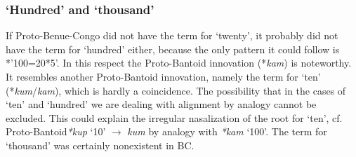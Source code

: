 \clearpage
\subsubsection{‘Hundred’ and ‘thousand’}\label{sec:3.1.4.10}
\begin{table}
\caption{\label{tab:3:63}BC stems and patterns for `100'  and `1000'}


\end{table}

If Proto-Benue-Congo did not have the term for ‘twenty’, it probably did not have the term for ‘hundred’ either, because the only pattern it could follow is *’100=20*5’. In this respect the Proto-Bantoid innovation (*\textit{kam}) is noteworthy. It resembles another Proto-Bantoid innovation, namely the term for ‘ten’ (*\textit{kum}/\textit{kam}), which is hardly a coincidence. The possibility that in the cases of ‘ten’ and ‘hundred’ we are dealing with alignment by analogy cannot be excluded. This could explain the irregular nasalization of the root for ‘ten’, cf. Proto-Bantoid\textit{*kup} ‘10’ ${\rightarrow}$ \textit{kum} by analogy with \textit{*kam} ‘100’.
The term for ‘thousand’ was certainly nonexistent in BC.

